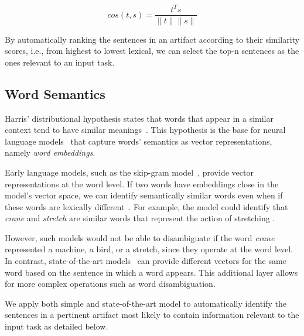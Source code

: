 \begin{equation}
    cos(t,s) = \frac{t^Ts}{\|t\| \|s\|}
    \label{eq:lex-sim}
\end{equation}


By automatically ranking the sentences in an artifact according to their similarity scores, i.e., from highest to lowest 
lexical,   we can  select the top-n sentences as the ones relevant to an input task.




\subsection{Word Semantics}




Harris' distributional hypothesis states that words that appear in a similar context tend to have similar meanings~\cite{harris1954distributional}.
This hypothesis is the base for neural language models~\cite{Mikolov2013, Devlin2018Bert} that capture words' semantics
as vector representations, namely \textit{word embeddings}. 


 
Early language models, such as the skip-gram model~\cite{Mikolov2013}, provide vector representations at the word level.
If two words have embeddings close in the model's vector space, we can identify semantically similar words even when if these words are lexically different~\cite{Mikolov2013}. For example, 
the model could identify that \textit{crane} and \textit{stretch} are similar words that represent the action of stretching .






However, such models would not be able to disambiguate if the word \textit{crane} represented a machine, a bird, or a stretch, since they operate at the word level.
In contrast, state-of-the-art models~\cite{Devlin2018Bert} can
provide different vectors for the same word based on the sentence in which a word appears.
This additional layer allows for more complex operations such as word disambiguation. 



We apply both simple and state-of-the-art model to 
automatically identify the sentences in a pertinent artifact most likely to contain information relevant to
the input task as detailed below.








